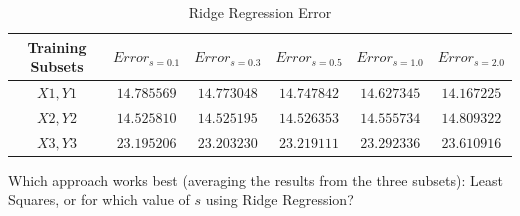 \documentclass[11pt]{article}
\begin{document}
\begin{table}[!h] 
    \centering
    \caption{Ridge Regression Error}
    \label{ErrRidge2}
    \begin{tabular}{|c|c|c|c|c|c|}
      \hline
   Training Subsets  & $Error_{s=0.1}$ & $Error_{s=0.3}$ &$Error_{s=0.5}$ &$Error_{s=1.0}$ &$Error_{s=2.0}$  \\
      \hline      
      $X1, Y1$ &      $14.785569$  & $14.773048$ & $14.747842$ & $14.627345$ & $14.167225$ \\
      \hline
      $X2, Y2$ &      $14.525810$   & $14.525195$ & $14.526353$ & $14.555734$ & $14.809322$ \\
      \hline
      $X3, Y3$ &      $23.195206$   & $23.203230$ & $23.219111$ & $23.292336$ & $23.610916$ \\
      \hline
    \end{tabular}
\end{table}

Which approach works best (averaging the results from the three subsets): Least Squares, or for which value of $s$ using Ridge Regression?
\end{document}

